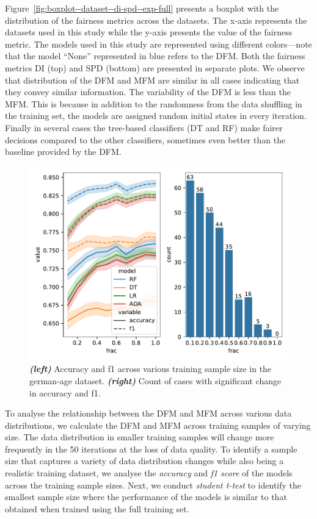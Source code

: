 \documentclass{article}
\begin{document}
Figure \ref{fig:boxplot--dataset--di-spd--exp-full} presents a boxplot
with the distribution of the fairness metrics across the datasets. The
x-axis represents the datasets used in this study while the y-axis
presents the value of the fairness metric. The models used in this
study are represented using different colors---note that the model
``None'' represented in blue refers to the DFM. Both the fairness
metrics DI (top) and SPD (bottom) are presented in separate plots. We
observe that distribution of the DFM and MFM are similar in all cases
indicating that they convey similar information. The variability of
the DFM is less than the MFM. This is because in addition to the
randomness from the data shuffling in the training set, the models are
assigned random initial states in every iteration. Finally in several
cases the tree-based classifiers (DT and RF) make fairer decisions
compared to the other classifiers, sometimes even better than the
baseline provided by the DFM.

\begin{figure}
  \centering
  \includegraphics[width=0.95\linewidth]{training-set-frac-threshold.pdf}
  \caption{\emph{\textbf{(left)}} Accuracy and f1 across various
  training sample size in the german-age
  dataset. \emph{\textbf{(right)}} Count of cases with significant
  change in accuracy and f1.}
  \label{fig:training-set-frac-threshold}
\end{figure}

To analyse the relationship between the DFM and MFM across various
data distributions, we calculate the DFM and MFM across training
samples of varying size. The data distribution in smaller training
samples will change more frequently in the 50 iterations at the loss
of data quality. To identify a sample size that captures a variety of
data distribution changes while also being a realistic training
dataset, we analyse the \emph{accuracy} and \emph{f1 score} of the
models across the training sample sizes. Next, we conduct
\emph{student t-test} to identify the smallest sample size where the
performance of the models is similar to that obtained when trained
using the full training set.
\end{document}
